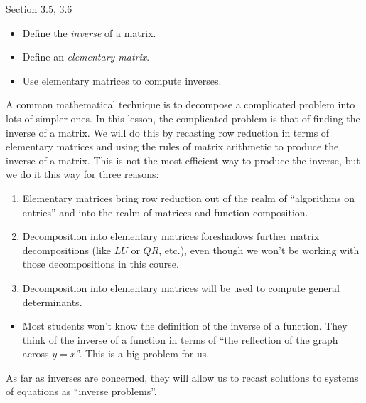 \begin{lesson}

	Section 3.5, 3.6

	\begin{itemize}
		\item Define the \emph{inverse} of a matrix.
		\item Define an \emph{elementary matrix}.
		\item Use elementary matrices to compute inverses.
	\end{itemize}

	A common mathematical technique is to decompose a complicated problem into lots of simpler ones.
	In this lesson, the complicated problem is that of finding the inverse of a matrix. We will do this
	by recasting row reduction in terms of elementary matrices and using the rules of matrix arithmetic
	to produce the inverse of a matrix. This is not the most efficient way to produce the inverse, but we
	do it this way for three reasons:
	\begin{enumerate}
		\item Elementary matrices bring row reduction out of the realm of ``algorithms on entries'' and into
			the realm of matrices and function composition.
		\item Decomposition into elementary matrices foreshadows further matrix decompositions (like $LU$ or $QR$, etc.),
			even though we won't be working with those decompositions in this course.
		\item Decomposition into elementary matrices will be used to compute general determinants.
	\end{enumerate}


	\begin{annotation}
		\begin{notes}
			\begin{itemize}
				\item Most students won't know the definition of the inverse of a function.
					They think of the inverse of a function in terms of ``the reflection of the graph
					across $y=x$''. This is a big problem for us.
			\end{itemize}
		\end{notes}
	\end{annotation}
	As far as inverses are concerned, they will allow us to recast solutions to systems of equations as ``inverse problems''.


\end{lesson}

